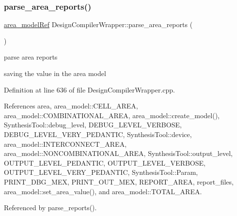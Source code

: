 \subsubsection{\texorpdfstring{parse\+\_\+area\+\_\+reports()}{parse\_area\_reports()}}
{\footnotesize\ttfamily \hyperlink{area__model_8hpp_aec11e4e9b1b3afd49a437cb37df0abfb}{area\+\_\+model\+Ref} Design\+Compiler\+Wrapper\+::parse\+\_\+area\+\_\+reports (\begin{DoxyParamCaption}{ }\end{DoxyParamCaption})}



parse area reports 

saving the value in the area model 

Definition at line 636 of file Design\+Compiler\+Wrapper.\+cpp.



References area, area\+\_\+model\+::\+C\+E\+L\+L\+\_\+\+A\+R\+EA, area\+\_\+model\+::\+C\+O\+M\+B\+I\+N\+A\+T\+I\+O\+N\+A\+L\+\_\+\+A\+R\+EA, area\+\_\+model\+::create\+\_\+model(), Synthesis\+Tool\+::debug\+\_\+level, D\+E\+B\+U\+G\+\_\+\+L\+E\+V\+E\+L\+\_\+\+V\+E\+R\+B\+O\+SE, D\+E\+B\+U\+G\+\_\+\+L\+E\+V\+E\+L\+\_\+\+V\+E\+R\+Y\+\_\+\+P\+E\+D\+A\+N\+T\+IC, Synthesis\+Tool\+::device, area\+\_\+model\+::\+I\+N\+T\+E\+R\+C\+O\+N\+N\+E\+C\+T\+\_\+\+A\+R\+EA, area\+\_\+model\+::\+N\+O\+N\+C\+O\+M\+B\+I\+N\+A\+T\+I\+O\+N\+A\+L\+\_\+\+A\+R\+EA, Synthesis\+Tool\+::output\+\_\+level, O\+U\+T\+P\+U\+T\+\_\+\+L\+E\+V\+E\+L\+\_\+\+P\+E\+D\+A\+N\+T\+IC, O\+U\+T\+P\+U\+T\+\_\+\+L\+E\+V\+E\+L\+\_\+\+V\+E\+R\+B\+O\+SE, O\+U\+T\+P\+U\+T\+\_\+\+L\+E\+V\+E\+L\+\_\+\+V\+E\+R\+Y\+\_\+\+P\+E\+D\+A\+N\+T\+IC, Synthesis\+Tool\+::\+Param, P\+R\+I\+N\+T\+\_\+\+D\+B\+G\+\_\+\+M\+EX, P\+R\+I\+N\+T\+\_\+\+O\+U\+T\+\_\+\+M\+EX, R\+E\+P\+O\+R\+T\+\_\+\+A\+R\+EA, report\+\_\+files, area\+\_\+model\+::set\+\_\+area\+\_\+value(), and area\+\_\+model\+::\+T\+O\+T\+A\+L\+\_\+\+A\+R\+EA.



Referenced by parse\+\_\+reports().


